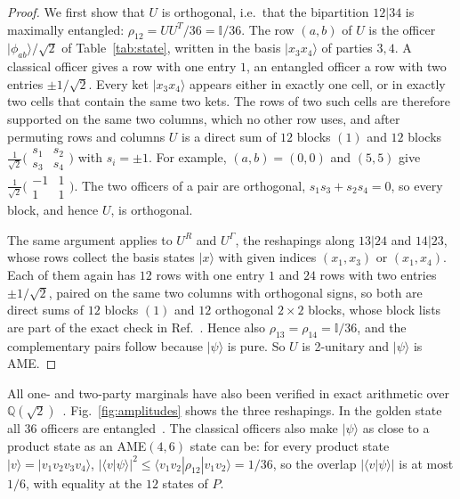 \documentclass[aps,pra,reprint,superscriptaddress,amsmath,amssymb,longbibliography]{revtex4-2}
\newcommand{\ket}[1]{\lvert #1\rangle}
\newcommand{\braket}[2]{\langle #1\vert #2\rangle}
\theoremstyle{plain}
\begin{document}
\begin{proof}
We first show that $U$ is orthogonal, i.e.\ that the bipartition $12|34$ is maximally entangled:
$\rho_{12}=UU^T/36=\mathbb I/36$.  The row $(a,b)$ of $U$ is the officer $\ket{\phi_{ab}}/\sqrt2$ of
Table~\ref{tab:state}, written in the basis $\ket{x_3x_4}$ of parties $3,4$.  A classical officer gives a row with one
entry $1$, an entangled officer a row with two entries $\pm1/\sqrt2$.  Every ket $\ket{x_3x_4}$ appears either in
exactly one cell, or in exactly two cells that contain the same two kets.  The rows of two such cells are therefore
supported on the same two columns, which no other row uses, and after permuting rows and columns $U$ is a direct sum of
$12$ blocks $(1)$ and $12$ blocks $\frac1{\sqrt2}\bigl(\begin{smallmatrix}s_1&s_2\\ s_3&s_4\end{smallmatrix}\bigr)$
with $s_i=\pm1$.  For example, $(a,b)=(0,0)$ and $(5,5)$ give
$\frac1{\sqrt2}\bigl(\begin{smallmatrix}-1&1\\ 1&1\end{smallmatrix}\bigr)$.  The two officers of a pair are
orthogonal, $s_1s_3+s_2s_4=0$, so every block, and hence $U$, is orthogonal.

The same argument applies to $U^R$ and $U^\Gamma$, the reshapings along $13|24$ and $14|23$, whose rows collect the
basis states $\ket x$ with given indices $(x_1,x_3)$ or $(x_1,x_4)$.  Each of them again has $12$ rows with one entry
$1$ and $24$ rows with two entries $\pm1/\sqrt2$, paired on the same two columns with orthogonal signs, so both are
direct sums of $12$ blocks $(1)$ and $12$ orthogonal $2\times2$ blocks, whose block lists are part of the exact check
in Ref.~\cite{repo}.  Hence also $\rho_{13}=\rho_{14}=\mathbb I/36$, and the complementary pairs follow because
$\ket\psi$ is pure.  So $U$ is 2-unitary and $\ket\psi$ is AME.
\end{proof}

All one- and two-party marginals have also been verified in exact arithmetic over $\mathbb Q(\sqrt2)$~\cite{repo}.
Fig.~\ref{fig:amplitudes} shows the three reshapings.  In the golden state all
$36$ officers are entangled~\cite{RBB22}.  The classical officers also make $\ket\psi$ as close to a product
state as an AME$(4,6)$ state can be: for every product state $\ket v=\ket{v_1v_2v_3v_4}$,
$|\braket{v}{\psi}|^2\le\langle v_1v_2|\rho_{12}|v_1v_2\rangle=1/36$, so the overlap $|\braket{v}{\psi}|$ is at most $1/6$, with
equality at the $12$ states of $P$.
\end{document}
